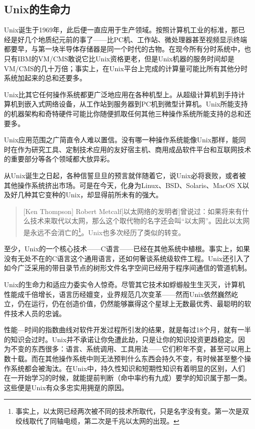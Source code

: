 \documentclass[12pt,oneside]{book}
\begin{document}
\begin{common-format}
\section{Unix的生命力}
Unix诞生于1969年，此后便一直应用于生产领域。按照计算机工业的标准，那已经是好几个地质纪元前的事了——比PC机、工作站、微处理器甚至视频显示终端都要早，与第一块半导体存储器是同一个时代的古物。在现今所有分时系统中，也只有IBM的VM/CMS敢说它比Unix资格更老，但是Unix机器的服务时间却是VM/CMS的几十万倍；事实上，在Unix平台上完成的计算量可能比所有其他分时系统加起来的总和还要多。

Unix比其它任何操作系统都更广泛地应用在各种机型上。从超级计算机到手持计算机到嵌入式网络设备，从工作站到服务器到PC机到微型计算机。Unix所能支持的机器架构和奇特硬件可能比你随便抓取任何其他三种操作系统所能支持的总和还要多。

Unix应用范围之广简直令人难以置信。没有哪一种操作系统能像Unix那样，能同时在作为研究工具、定制技术应用的友好宿主机、商用成品软件平台和互联网技术的重要部分等各个领域都大放异彩。

从Unix诞生之日起，各种信誓旦旦的预言就伴随着它，说Unix必将衰败，或者被其他操作系统挤出市场。可是在今天，化身为Linux、BSD、Solaris、MacOS X以及好几种其它变种的Unix，却显得前所未有的强大。
\begin{quote}[Ken Thompson]
Robert Metcalf[以太网络的发明者]曾说过：如果将来有什么技术来取代以太网，那么这个取代物的名字还会叫“以太网”。因此以太网是永远不会消亡的\footnote{事实上，以太网已经两次被不同的技术所取代，只是名字没有变。第一次是双绞线取代了同轴电缆，第二次是千兆以太网的出现。}。Unix也多次经历了类似的转变。
\end{quote}

至少，Unix的一个核心技术——C语言——已经在其他系统中植根。事实上，如果没有无处不在的C语言这个通用语言，还如何奢谈系统级软件工程。Unix还引入了如今广泛采用的带目录节点的树形文件名字空间已经用于程序间通信的管道机制。

Unix的生命力和适应力委实令人惊奇。尽管其它技术如蜉蝣般生生灭灭，计算机性能成千倍增长，语言历经嬗变，业界规范几次变革——然而Unix依然巍然屹立，仍在运行，仍在创造价值，仍然能够赢得这个星球上无数最优秀、最聪明的软件技术人员的忠诚。

性能—时间的指数曲线对软件开发过程所引发的结果，就是每过18个月，就有一半的知识会过时。Unix并不承诺让你免遭此劫，只是让你的知识投资更趋稳定。因为不变的东西很多：语言、系统调用、工具用法——它们积年不变，甚至可以用上数十载。而在其他操作系统中则无法预判什么东西会持久不变，有时候甚至整个操作系统都会被淘汰。在Unix中，持久性知识和短期性知识有着明显的区别，人们在一开始学习的时候，就能提前判断（命中率约有九成）要学的知识属于那一类。这些便是Unix有众多忠实用拥趸的原因。


\end{common-format}
\end{document}
